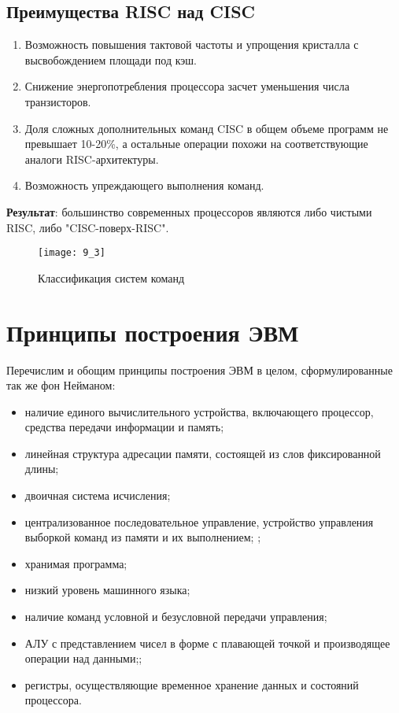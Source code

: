 \subsection{Преимущества RISC над CISC}
\begin{enumerate}
  \item Возможность повышения тактовой частоты и упрощения кристалла с высвобождением площади под кэш.
  \item Снижение энергопотребления процессора засчет уменьшения числа транзисторов.
  \item Доля сложных дополнительных команд CISC в общем объеме программ не превышает 10-20\%, а остальные операции похожи на соответствующие аналоги RISC-архитектуры.
  \item Возможность упреждающего выполнения команд.
\end{enumerate}
\textbf{Результат}: большинство современных процессоров являются либо чистыми RISC, либо "CISC-поверх-RISC".
\begin{figure}[h]
\centering
\texttt{[image: 9\_3]}
\caption{Классификация систем команд}
\label{commands}
\end{figure}
\section{Принципы построения ЭВМ}
Перечислим и обощим принципы построения ЭВМ в целом, сформулированные так же фон Нейманом:
\begin{itemize}
  \item наличие единого вычислительного устройства, включающего процессор, средства передачи информации и память;
  \item линейная структура адресации памяти, состоящей из слов фиксированной длины;
  \item двоичная система исчисления;
  \item централизованное последовательное управление, устройство управления выборкой команд из памяти и их выполнением; ;
  \item хранимая программа;
  \item низкий уровень машинного языка;
  \item наличие команд условной и безусловной передачи управления;
  \item АЛУ с представлением чисел в форме с плавающей точкой и производящее операции над данными;;
  \item регистры, осуществляющие временное хранение данных и состояний процессора.
\end{itemize}
